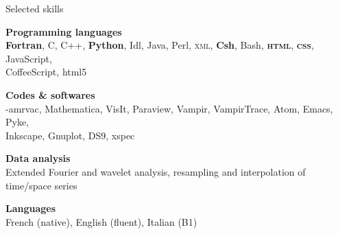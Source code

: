 \documentclass[a4paper,oneside]{cv}
\begin{document}
\vspace*{-0.1cm}
\begin{rubrique}{Selected skills}

\textbf{Programming languages}\\
\hspace*{1cm}\textbf{Fortran}, C, C++, \textbf{Python}, Idl, Java, Perl, \textsc{xml}, \textbf{Csh}, Bash, \textbf{\textsc{html}}, \textbf{\textsc{css}}, JavaScript, \\
\hspace*{1cm}CoffeeScript, {\sc html5}

\textbf{Codes \& softwares}\\
\hspace*{1cm}{\sc mpi}-{\sc amrvac}, Mathematica, VisIt, Paraview, Vampir, VampirTrace, Atom, Emacs, Pyke,\\
\hspace*{1cm}Inkscape, Gnuplot, DS9, {\sc xspec}

\textbf{Data analysis}\\
\hspace*{1cm}Extended Fourier and wavelet analysis, resampling and interpolation of time/space series

\textbf{Languages}\\
\hspace*{1cm} French (native), English (fluent), Italian (B1)

\end{rubrique}
\end{document}
